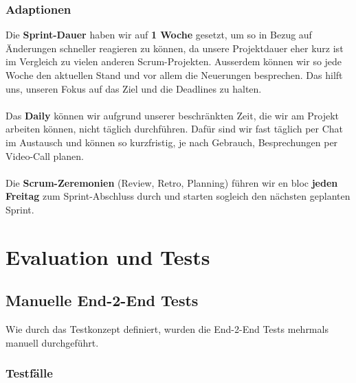 \documentclass[a4paper,12pt]{report}
\begin{document}
    \subsection{Adaptionen}
    Die \textbf{Sprint-Dauer} haben wir auf \textbf{1 Woche} gesetzt, um so in Bezug auf Änderungen
    schneller reagieren zu können, da unsere Projektdauer eher kurz ist im Vergleich zu
    vielen anderen Scrum-Projekten.
    Ausserdem können wir so jede Woche den aktuellen Stand und vor allem die Neuerungen besprechen.
    Das hilft uns, unseren Fokus auf das Ziel und die Deadlines zu halten.
    \\\\
    Das \textbf{Daily} können wir aufgrund unserer beschränkten Zeit, die wir am Projekt arbeiten können, nicht täglich durchführen.
    Dafür sind wir fast täglich per Chat im Austausch und können so kurzfristig, je nach Gebrauch, Besprechungen per Video-Call planen.
    \\\\
    Die \textbf{Scrum-Zeremonien} (Review, Retro, Planning) führen wir en bloc \textbf{jeden Freitag} zum
    Sprint-Abschluss durch und starten sogleich den nächsten geplanten Sprint.


    \chapter{Evaluation und Tests}


    \section{Manuelle End-2-End Tests}
    Wie durch das Testkonzept definiert, wurden die End-2-End Tests mehrmals manuell durchgeführt.

    \subsection{Testfälle}
\end{document}
